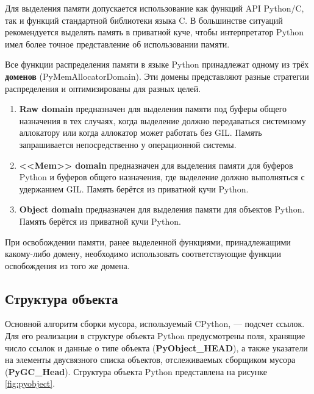Для выделения памяти допускается использование как функций API Python/C, так и функций стандартной библиотеки языка C. В большинстве ситуаций рекомендуется выделять память в приватной куче, чтобы интерпретатор Python имел более точное представление об использовании памяти. \cite{python_memory}

Все функции распределения памяти в языке Python принадлежат одному из трёх \textbf{доменов} (PyMemAllocatorDomain). Эти домены представляют разные стратегии распределения и оптимизированы для разных целей. \cite{python_memory}

\begin{enumerate}[label*=\arabic*.]
	\item \textbf{Raw domain} предназначен для выделения памяти под буферы общего назначения в тех случаях, когда выделение должно передаваться системному аллокатору или когда аллокатор может работать без GIL. Память запрашивается непосредственно у операционной системы.
	\item \textbf{<<Mem>> domain} предназначен для выделения памяти для буферов Python и буферов общего назначения, где выделение должно выполняться с удержанием GIL. Память берётся из приватной кучи Python.
	\item \textbf{Object domain} предназначен для выделения памяти для объектов Python. Память берётся из приватной кучи Python.
\end{enumerate}

При освобождении памяти, ранее выделенной функциями, принадлежащими какому-либо домену, необходимо использовать соответствующие функции освобождения из того же домена. \cite{python_memory}



\subsection{Структура объекта}

Основной алгоритм сборки мусора, используемый CPython, --- подсчет ссылок. Для его реализации в структуре объекта Python предусмотрены поля, хранящие число ссылок и данные о типе объекта (\textbf{PyObject\_HEAD}), а также указатели на элементы двусвязного списка объектов, отслеживаемых сборщиком мусора (\textbf{PyGC\_Head}). Структура объекта Python представлена на рисунке \ref{fig:pyobject}.~\cite{python_gc}

